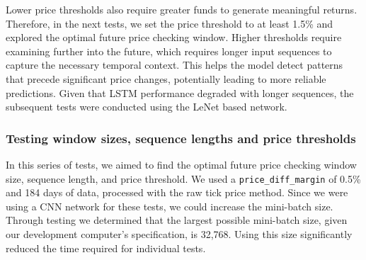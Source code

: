 \documentclass[a4paper,oneside,onecolumn,12pt]{book}
\begin{document}
		Lower price thresholds also require greater funds to generate meaningful returns. Therefore, in the next tests, we set the price threshold to at least 1.5\% and explored the optimal future price checking window. Higher thresholds require examining further into the future, which requires longer input sequences to capture the necessary temporal context. This helps the model detect patterns that precede significant price changes, potentially leading to more reliable predictions. Given that LSTM performance degraded with longer sequences, the subsequent tests were conducted using the LeNet based network.

		\subsubsection{Testing window sizes, sequence lengths and price thresholds}
		In this series of tests, we aimed to find the optimal future price checking window size, sequence length, and price threshold. We used a \texttt{price\_diff\_margin} of 0.5\% and 184 days of data, processed with the raw tick price method. Since we were using a CNN network for these tests, we could increase the mini-batch size. Through testing we determined that the largest possible mini-batch size, given our development computer's specification, is 32,768. Using this size significantly reduced the time required for individual tests.
\end{document}
